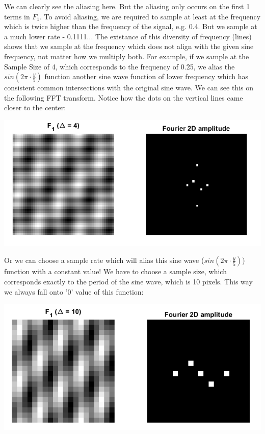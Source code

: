 \documentclass[a4paper]{iacas}
\begin{document}
We can clearly see the aliasing here. But the aliasing only occurs on the first 1 terms in $F_{1}$. To avoid aliasing, we are required to sample at least at the frequency which is twice higher than the frequency of the signal, e.g. 0.4. But we sample at a much lower rate - 0.1111... The existance of this diversity of frequency (lines) shows that we sample at the frequency which does not align with the given sine frequency, not matter how we multiply both. For example, if we sample at the Sample Size of 4, which corresponds to the frequency of 0.25, we alias the $sin(2\pi \cdot \frac{y}{5})$ function another sine wave function of lower frequency which has consistent common intersections with the original sine wave. We can see this on the following FFT transform. Notice how the dots on the vertical lines came closer to the center:
\vskip 0.1in
\begin{minipage}{0.8\textwidth}
\centering
	\includegraphics[scale=0.8]{../imgs/q1_3_1.png}
\end{minipage}
\vskip 0.1in

Or we can choose a sample rate which will alias this sine wave ($sin(2\pi \cdot \frac{y}{5})$) function with a constant value! We have to choose a sample size, which corresponds exactly to the period of the sine wave, which is 10 pixels. This way we always fall onto '0' value of this function:

\vskip 0.1in
\begin{minipage}{0.8\textwidth}
\centering
	\includegraphics[scale=0.8]{../imgs/q1_3_2.png}
\end{minipage}
\vskip 0.1in
\end{document}
